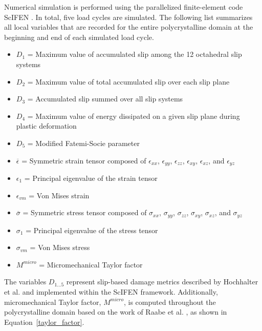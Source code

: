 Numerical simulation is performed using the parallelized finite-element code ScIFEN \cite{warner2016scalable}. In total, five load cycles are simulated. The following list summarizes all local variables that are recorded for the entire polycrystalline domain at the beginning and end of each simulated load cycle.

\begin{itemize}[noitemsep]
  \renewcommand\labelitemi{}
  \item $D_1$ \tabto{1.5cm} = \tabto{2cm} Maximum value of accumulated slip among the 12 octahedral slip systems 
  \item $D_2$ \tabto{1.5cm} = \tabto{2cm} Maximum value of total accumulated slip over each slip plane
  \item $D_3$ \tabto{1.5cm} = \tabto{2cm} Accumulated slip summed over all slip systems
  \item $D_4$ \tabto{1.5cm} = \tabto{2cm} Maximum value of energy dissipated on a given slip plane during plastic deformation
  \item $D_5$ \tabto{1.5cm} = \tabto{2cm} Modified Fatemi-Socie parameter
  \item $\overline{\epsilon}$ \tabto{1.5cm} = \tabto{2cm} Symmetric strain tensor composed of $\epsilon_{xx}$, $\epsilon_{yy}$, $\epsilon_{zz}$, $\epsilon_{xy}$, $\epsilon_{xz}$, and $\epsilon_{yz}$
  \item $\epsilon_{1}$ \tabto{1.5cm} = \tabto{2cm} Principal eigenvalue of the strain tensor
  \item $\epsilon_{vm}$ \tabto{1.5cm} = \tabto{2cm} Von Mises strain
  \item $\overline{\sigma}$ \tabto{1.5cm} = \tabto{2cm} Symmetric stress tensor composed of $\sigma_{xx}$, $\sigma_{yy}$, $\sigma_{zz}$, $\sigma_{xy}$, $\sigma_{xz}$, and $\sigma_{yz}$
  \item $\sigma_{1}$ \tabto{1.5cm} = \tabto{2cm} Principal eigenvalue of the stress tensor
  \item $\sigma_{vm}$ \tabto{1.5cm} = \tabto{2cm} Von Mises stress
  \item $M^{micro}$ \tabto{1.5cm} = \tabto{2cm} Micromechanical Taylor factor \cite{raabe2001}
\end{itemize}

The variables $D_{1...5}$ represent slip-based damage metrics described by Hochhalter et al. \cite{hochhalter2010geometric} and implemented within the ScIFEN framework. Additionally, micromechanical Taylor factor, $M^{micro}$, is computed throughout the polycrystalline domain based on the work of Raabe et al. \cite{raabe2001}, as shown in Equation~\ref{taylor_factor}.

